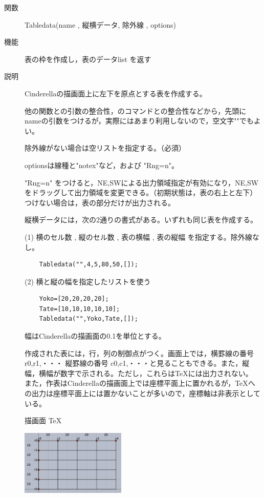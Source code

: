 \documentclass[papersize,a4paper,12pt,uplatex]{jsarticle}
\begin{document}
\begin{description}

\hypertarget{tabledata}{}
\item[関数]  Tabledata(name , 縦横データ, 除外線 , options)
\item[機能]  表の枠を作成し，表のデータlist を返す
\item[説明]  Cinderellaの描画面上に左下を原点とする表を作成する。

他の関数との引数の整合性，\ketpic のコマンドとの整合性などから，先頭にnameの引数をつけるが，実際にはあまり利用しないので，空文字""でもよい。

除外線がない場合は空リストを指定する。（必須）

optionsは線種と"notex"など，および "Rng=n"。

"Rng=n" をつけると，NE,SWによる出力領域指定が有効になり，NE,SWをドラッグして出力領域を変更できる。（初期状態は，表の右上と左下）つけない場合は，表の部分だけが出力される。

縦横データには，次の2通りの書式がある。いずれも同じ表を作成する。

\vspace{\baselineskip}
(1) 横のセル数 , 縦のセル数 , 表の横幅 , 表の縦幅  を指定する。除外線なし。

\begin{verbatim}
    Tabledata("",4,5,80,50,[]);
\end{verbatim}
  
(2) 横と縦の幅を指定したリストを使う
\begin{verbatim}
    Yoko=[20,20,20,20];
    Tate=[10,10,10,10,10];
    Tabledata("",Yoko,Tate,[]);
 \end{verbatim}

幅はCinderellaの描画面の0.1を単位とする。

作成された表には，行，列の制御点がつく。画面上では，横罫線の番号 r0,r1,・・・  縦罫線の番号 c0,c1,・・・と見ることもできる。また，縦幅，横幅が数字で示される。ただし，これらは\TeX には出力されない。
また，作表はCinderellaの描画面上では座標平面上に置かれるが，\TeX への出力は座標平面上には置かないことが多いので，座標軸は非表示としている。

\hspace{25mm} 描画面 \hspace{45mm} TeX

\hspace{5mm}\includegraphics[bb=0 0 403.52 249.51 , width=5cm]{Fig/table01.pdf}   \hspace{10mm}   



\end{description}
\end{document}
